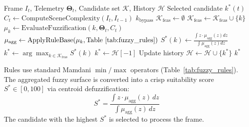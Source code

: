 \documentclass[conference]{IEEEtran}
\begin{document}
\begin{algorithmic}[1]
\REQUIRE Frame $I_t$, Telemetry $\mathbf{\Theta}_t$, Candidate set $\mathcal{K}$, History $\mathcal{H}$
\ENSURE Selected candidate $k^*(t)$
\STATE $C_t \leftarrow \text{ComputeSceneComplexity}(I_t, I_{t-1})$
    \RETURN $k_{\text{bypass}}$ 
\ENDIF
\STATE $\mathcal{K}_{\text{feas}} \leftarrow \emptyset$
        \STATE $\mathcal{K}_{\text{feas}} \leftarrow \mathcal{K}_{\text{feas}} \cup \{k\}$
    \ENDIF
\ENDFOR
{}
    \STATE $\mu_k \leftarrow \text{EvaluateFuzzification}(k, \mathbf{\Theta}_t, C_t)$
    \STATE $\mu_{\text{agg}} \leftarrow \text{ApplyRuleBase}(\mu_k, \text{Table~\ref{tab:fuzzy_rules}})$
    \STATE $S^*(k) \leftarrow \frac{\int z \cdot \mu_{\text{agg}}(z) dz}{\int \mu_{\text{agg}}(z) dz}$ 
\ENDFOR
\STATE $k^* \leftarrow \arg\max_{k \in \mathcal{K}_{\text{feas}}} S^*(k)$
    \STATE $k^* \leftarrow \mathcal{H}[-1]$ 
\ENDIF
\STATE Update history $\mathcal{H} \leftarrow \mathcal{H} \cup \{k^*\}$
\RETURN $k^*$
\end{algorithmic}

Rules use standard Mamdani $\min/\max$ operators (Table~\ref{tab:fuzzy_rules}). The aggregated fuzzy surface is converted into a crisp suitability score $S^* \in [0, 100]$ via centroid defuzzification:
\begin{equation}
S^* = \frac{\int z \cdot \mu_{\text{agg}}(z) \, dz}{\int \mu_{\text{agg}}(z) \, dz}
\end{equation}
The candidate with the highest $S^*$ is selected to process the frame.
\end{document}
